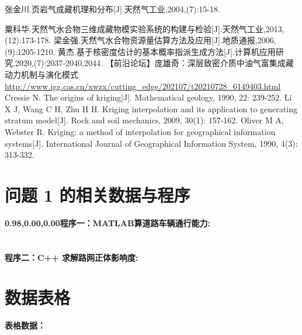 \documentclass[12pt,a4paper]{nmmcm}
\begin{document}
\begin{thebibliography}{99}
   张金川.页岩气成藏机理和分布[J].天然气工业,2004,(7):15-18.

   粟科华.天然气水合物三维成藏物模实验系统的构建与检验[J].天然气工业,2013,(12):173-178.
   梁金强.天然气水合物资源量估算方法及应用[J].地质通报,2006,(9):1205-1210.
   黄杰.基于核密度估计的基本概率指派生成方法[J].计算机应用研究,2020,(7):2037-2040,2044.
   【前沿论坛】庞雄奇：深层致密介质中油气富集成藏动力机制与演化模式
  \url{http://www.igg.cas.cn/xwzx/cutting_edge/202107/t20210728_6149403.html}
  Cressie N. The origins of kriging[J]. Mathematical geology, 1990, 22: 239-252.
  Li X J, Wang C H, Zhu H H. Kriging interpolation and its application to generating stratum model[J]. Rock and soil mechanics, 2009, 30(1): 157-162.
  Oliver M A, Webster R. Kriging: a method of interpolation for geographical information systems[J]. International Journal of Geographical Information System, 1990, 4(3): 313-332.

\end{thebibliography}
\newpage

\begin{appendices}

  \section*{问题 1 的相关数据与程序}

  \textbf{{0.98,0.00,0.00}{程序一：MATLAB算道路车辆通行能力:}}
  

  \section*{}

  \textcolor[rgb]{0.98,0.00,0.00}{\textbf{程序二：C++ 求解路网正体影响度:}}
  

  \newpage
  \def\thesection{A}
  \renewcommand{\thetable}{\wuhao A-\arabic{table}}
  \setcounter{table}{0}
  \section*{数据表格}
  \textcolor[rgb]{0.98,0.00,0.00}{\textbf{表格数据：}}
  

\end{appendices}
\end{document}
